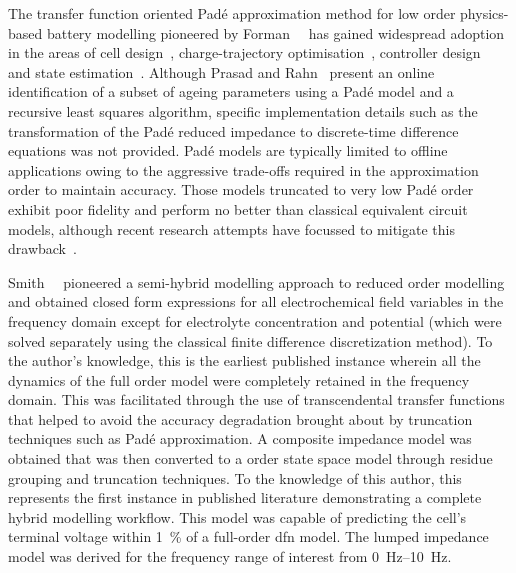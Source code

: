 The     transfer     function     oriented    Padé     approximation     method
for    low    order    physics-based     battery    modelling    pioneered    by
Forman~\etal{}~\cite{Forman2011a}    has   gained    widespread   adoption    in
the    areas     of    cell     design~\cite{Marcicki2013},    charge-trajectory
optimisation~\cite{Bashash2010},    controller    design~\cite{Perez2015}    and
state    estimation~\cite{Marcicki2013,Moura2012}.     Although    Prasad    and
Rahn~\cite{Prasad2013} present  an online identification  of a subset  of ageing
parameters using a Padé model and a recursive least squares algorithm, specific
implementation details such as the transformation of the Padé reduced impedance
to  discrete-time  difference  equations  was not  provided.  Padé  models  are
typically limited  to offline  applications owing  to the  aggressive trade-offs
required in the approximation order to maintain accuracy. Those models truncated
to  very low  Padé  order exhibit  poor  fidelity and  perform  no better  than
classical  equivalent circuit  models,  although recent  research attempts  have
focussed  to  mitigate  this  drawback~\cite{Yuan2017a,Yuan2017}.


Smith~\etal{}~\cite{Smith2007}  pioneered   a  semi-hybrid   modelling  approach
to  reduced  order  modelling  and  obtained closed  form  expressions  for  all
electrochemical field variables  in the frequency domain  except for electrolyte
concentration and  potential (which were  solved separately using  the classical
finite difference discretization method). To the author's knowledge, this is the
earliest  published  instance  wherein  all  the  dynamics  of  the  full  order
model were  completely retained  in the frequency  domain. This  was facilitated
through  the use  of  transcendental  transfer functions  that  helped to  avoid
the  accuracy  degradation  brought  about  by  truncation  techniques  such  as
Padé  approximation. A  composite impedance  model was  obtained that  was then
converted  to  a    order state  space  model  through  residue
grouping  and truncation  techniques.  To  the knowledge  of  this author,  this
represents the first  instance in published literature  demonstrating a complete
hybrid  modelling workflow.  This model  was  capable of  predicting the  cell's
terminal voltage  within \SI{1}{\percent} of  a full-order \gls{dfn}  model. The
lumped impedance  model was  derived for  the frequency  range of  interest from
\SIrange{0}{10}{\hertz}.

